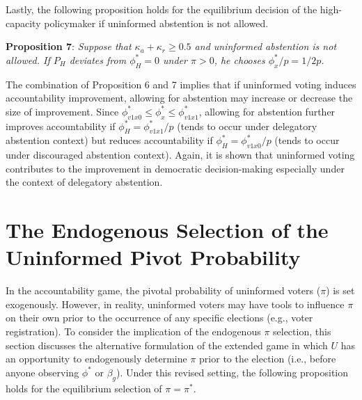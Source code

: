 \documentclass[letterpaper, 12pt]{article}
\begin{document}
    \par Lastly, the following proposition holds for the equilibrium decision of the high-capacity policymaker if uninformed abstention is not allowed. 
    
    \noindent \textbf{Proposition 7}: \textit{Suppose that $\kappa_a+\kappa_r \geq 0.5$ and uninformed abstention is not allowed. If $P_H$ deviates from $\phi^*_H=0$ under $\pi>0$, he chooses $\phi^*_x/p=1/2p$.}  

    \noindent The combination of Proposition 6 and 7 implies that if uninformed voting induces accountability improvement, allowing for abstention may increase or decrease the size of improvement. Since $\phi^*_{v1x0} \leq \phi^*_x \leq  \phi^*_{v1x1}$, allowing for abstention further improves accountability if $\phi^*_H=\phi^*_{v1x1}/p$ (tends to occur under delegatory abstention context) but reduces accountability if $\phi^*_H=\phi^*_{v1x0}/p$ (tends to occur under discouraged abstention context). Again, it is shown that uninformed voting contributes to the improvement in democratic decision-making especially under the context of delegatory abstention.
    
    \section*{The Endogenous Selection of the Uninformed Pivot Probability}

    \par In the accountability game, the pivotal probability of uninformed voters ($\pi$) is set exogenously. However, in reality, uninformed voters may have tools to influence $\pi$ on their own prior to the occurrence of any specific elections (e.g., voter registration). To consider the implication of the endogenous $\pi$ selection, this section discusses the alternative formulation of the extended game in which $U$ has an opportunity to endogenously determine $\pi$ prior to the election (i.e., before anyone observing $\phi^*$ or $\beta_g$). Under this revised setting, the following proposition holds for the equilibrium selection of $\pi=\pi^*$. 
    
\end{document}
